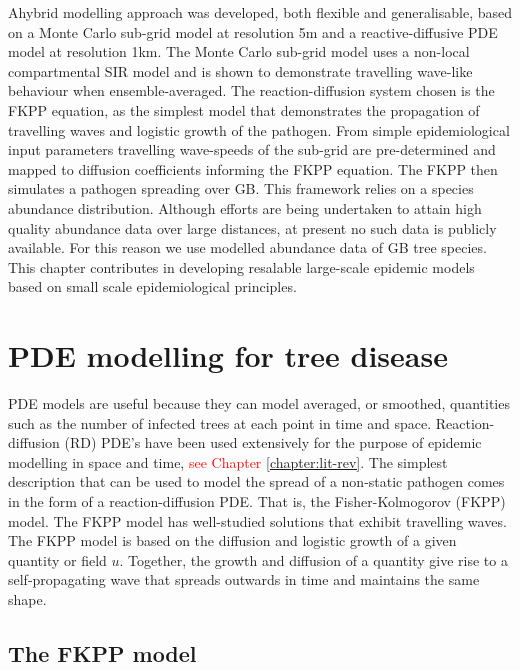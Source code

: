 Ahybrid modelling approach was developed, both flexible and generalisable, based on a Monte Carlo sub-grid model at resolution 5m and a reactive-diffusive PDE model at resolution 1km. %
 The Monte Carlo sub-grid model uses a non-local compartmental SIR model and is shown to demonstrate travelling wave-like behaviour when ensemble-averaged. %
 The reaction-diffusion system chosen is the FKPP equation, as the simplest model that  demonstrates the propagation of travelling waves and logistic growth of the pathogen. From simple epidemiological input parameters travelling wave-speeds of the sub-grid are pre-determined and mapped to diffusion coefficients informing the FKPP equation. %
 The FKPP then simulates a pathogen spreading over GB. This framework relies on a species abundance distribution. %
 Although efforts are being undertaken to attain high quality abundance data over large distances, at present no such data is publicly available. %
 For this reason we use modelled abundance data of GB tree species. This chapter contributes in  developing resalable large-scale epidemic models based on small scale epidemiological principles. %

\section{PDE modelling for tree disease}
PDE models are useful because they can model averaged, or smoothed, quantities such as the number of infected trees at each point in time and space. Reaction-diffusion (RD) PDE's  have been used extensively for the purpose of epidemic modelling in space and time, \textcolor{red}{see Chapter \ref{chapter:lit-rev}}. The simplest description that can be used to model the spread of a non-static pathogen comes in the form of a reaction-diffusion PDE. That is, the Fisher-Kolmogorov (FKPP) model. The FKPP model has well-studied solutions that exhibit travelling waves. The FKPP model is based on the diffusion and logistic growth of a given quantity or field $u$. %
Together, the growth and diffusion of a quantity give rise to a self-propagating wave that spreads outwards in time and maintains the same shape.\\

\subsection{The FKPP model}

